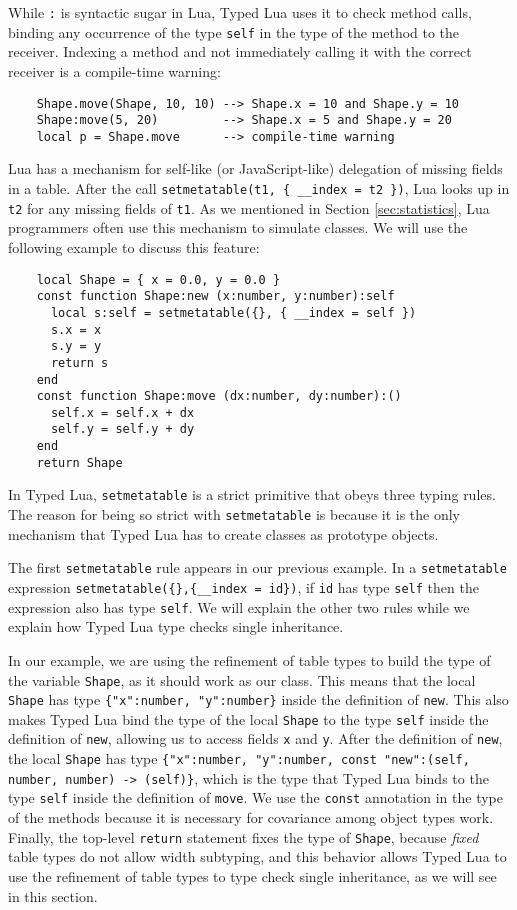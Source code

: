 While \texttt{:} is syntactic sugar in Lua, Typed Lua uses it
to check method calls, binding any occurrence of the type \texttt{self}
in the type of the method to the receiver.
Indexing a method and not immediately calling it with the correct
receiver is a compile-time warning:
\begin{verbatim}
    Shape.move(Shape, 10, 10) --> Shape.x = 10 and Shape.y = 10
    Shape:move(5, 20)         --> Shape.x = 5 and Shape.y = 20
    local p = Shape.move      --> compile-time warning
\end{verbatim}

Lua has a mechanism for self-like (or JavaScript-like) delegation of
missing fields in a table.
After the call \texttt{setmetatable(t1, \{ \string_\string_index = t2 \})},
Lua looks up in \texttt{t2} for any missing fields of \texttt{t1}.
As we mentioned in Section \ref{sec:statistics},
Lua programmers often use this mechanism to simulate classes.
We will use the following example to discuss this feature:
\begin{verbatim}
    local Shape = { x = 0.0, y = 0.0 }
    const function Shape:new (x:number, y:number):self
      local s:self = setmetatable({}, { __index = self })
      s.x = x
      s.y = y
      return s
    end
    const function Shape:move (dx:number, dy:number):()
      self.x = self.x + dx
      self.y = self.y + dy
    end
    return Shape
\end{verbatim}

In Typed Lua, \texttt{setmetatable} is a strict primitive
that obeys three typing rules.
The reason for being so strict with \texttt{setmetatable} is because
it is the only mechanism that Typed Lua has to create classes
as prototype objects.

The first \texttt{setmetatable} rule appears in our previous example.
In a \texttt{setmetatable} expression
\texttt{setmetatable(\{\},\{\string_\string_index = id\})},
if \texttt{id} has type \texttt{self} then the expression also has type \texttt{self}.
We will explain the other two rules while we explain how
Typed Lua type checks single inheritance.

In our example, we are using the refinement of table types to
build the type of the variable \texttt{Shape},
as it should work as our class.
This means that the local \texttt{Shape} has type
\texttt{\{"x":number, "y":number\}} inside the definition of \texttt{new}.
This also makes Typed Lua bind the type of the local \texttt{Shape}
to the type \texttt{self} inside the definition of \texttt{new},
allowing us to access fields \texttt{x} and \texttt{y}.
After the definition of \texttt{new}, the local \texttt{Shape}
has type
\texttt{\{"x":number, "y":number, const "new":(self, number, number) -> (self)\}},
which is the type that Typed Lua binds to the type \texttt{self}
inside the definition of \texttt{move}.
We use the \texttt{const} annotation in the type of the methods
because it is necessary for covariance among object types work.
Finally, the top-level \texttt{return} statement fixes the type of
\texttt{Shape}, because \emph{fixed} table types do not allow width
subtyping, and this behavior allows Typed Lua to use the refinement
of table types to type check single inheritance, as we will see in
this section.

